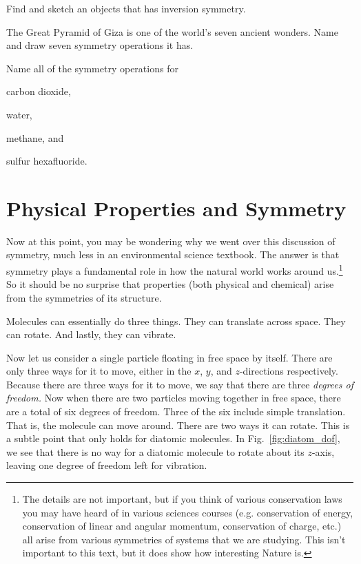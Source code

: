     \begin{exercise}
       Find and sketch an objects that has inversion symmetry.
    \end{exercise}
        
    \begin{exercise}
     The Great Pyramid of Giza is one of the world's seven ancient wonders. Name and draw seven symmetry operations it has.
     \label{ex:giza}
    \end{exercise}

    \begin{exercise}
        Name all of the symmetry operations for
        \begin{enumerate*}[(a)]
            \item carbon dioxide,
            \item water,
            \item methane, and
            \item sulfur hexafluoride.
        \end{enumerate*}
    \end{exercise}


    \section*{Physical Properties and Symmetry} %
    \label{sec:sym_phys_prop}

    Now at this point, you may be wondering why we went over this discussion of symmetry, much less in an environmental science textbook. The answer is that symmetry plays a fundamental role in how the natural world works around us.\footnote{
        The details are not important, but if you think of various conservation laws you may have heard of in various sciences courses (e.g. conservation of energy, conservation of linear and angular momentum, conservation of charge, etc.) all arise from various symmetries of systems that we are studying. This isn't important to this text, but it does show how interesting Nature is.
        } 
    So it should be no surprise that properties (both physical and chemical) arise from the symmetries of its structure. 
    
    Molecules can essentially do three things. They can translate across space. They can rotate. And lastly, they can vibrate.

    Now let us consider a single particle floating in free space by itself. There are only three ways for it to move, either in the $x$, $y$, and $z$-directions respectively. Because there are three ways for it to move, we say that there are three \emph{degrees of freedom.} Now when there are two particles moving together in free space, there are a total of six degrees of freedom. Three of the six include simple translation. That is, the molecule can move around. There are two ways it can rotate. This is a subtle point that only holds for diatomic molecules. In Fig.~\ref{fig:diatom_dof}, we see that there is no way for a diatomic molecule to rotate about its $z$-axis, leaving one degree of freedom left for vibration. 

